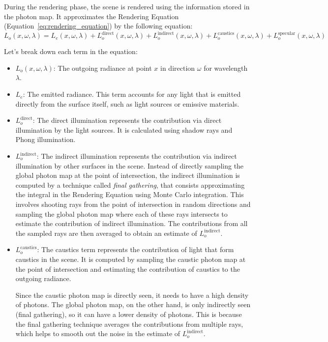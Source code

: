 During the rendering phase, the scene is rendered using the information stored in the photon map. It approximates the Rendering Equation (Equation~\ref{eq:rendering_equation}) by the following equation:
\begin{equation*}
    L_o(x, \omega, \lambda) = L_e(x, \omega, \lambda) + L_o^{\text{direct}}(x, \omega, \lambda) + L_o^{\text{indirect}}(x, \omega, \lambda) + L_o^{\text{caustics}}(x, \omega, \lambda) + L_o^{\text{specular}}(x, \omega, \lambda)
\end{equation*}

Let's break down each term in the equation:
\begin{itemize}
    \item $L_o(x, \omega, \lambda)$: The outgoing radiance at point $x$ in direction $\omega$ for wavelength $\lambda$.
    \item $L_e$: The emitted radiance. This term accounts for any light that is emitted directly from the surface itself, such as light sources or emissive materials.
    \item $L_o^{\text{direct}}$: The direct illumination represents the contribution via direct illumination by the light sources. It is calculated using shadow rays and Phong illumination.

    \item $L_o^{\text{indirect}}$: The indirect illumination represents the contribution via indirect illumination by other surfaces in the scene. Instead of directly sampling the global photon map at the point of intersection, the indirect illumination is computed by a technique called \emph{final gathering}, that consists approximating the integral in the Rendering Equation using Monte Carlo integration. This involves shooting rays from the point of intersection in random directions and sampling the global photon map where each of these rays intersects to estimate the contribution of indirect illumination. The contributions from all the sampled rays are then averaged to obtain an estimate of $L_o^{\text{indirect}}$.
    
    \item $L_o^{\text{caustics}}$: The caustics term represents the contribution of light that form caustics in the scene. It is computed by sampling the caustic photon map at the point of intersection and estimating the contribution of caustics to the outgoing radiance.
    
    \begin{observacion}
    Since the caustic photon map is directly seen, it needs to have a high density of photons. The global photon map, on the other hand, is only indirectly seen (final gathering), so it can have a lower density of photons. This is because the final gathering technique averages the contributions from multiple rays, which helps to smooth out the noise in the estimate of $L_o^{\text{indirect}}$.
    \end{observacion}
    

\end{itemize}

